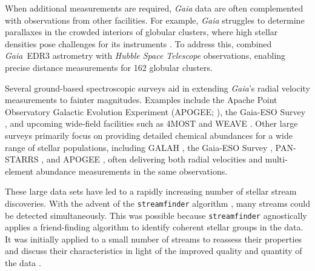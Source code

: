     When additional measurements are required, \emph{Gaia} data are often complemented with observations from other facilities.  For example, \emph{Gaia} struggles to determine parallaxes in the crowded interiors of globular clusters, where high stellar densities pose challenges for its instruments \citep{2017MNRAS.467..412P}. To address this, \citet{2021MNRAS.505.5957B} combined \emph{Gaia}~EDR3 astrometry with \emph{Hubble Space Telescope} observations, enabling precise distance measurements for 162 globular clusters.

    Several ground-based spectroscopic surveys aid in extending \emph{Gaia}'s radial velocity measurements to fainter magnitudes. Examples include the Apache Point Observatory Galactic Evolution Experiment (APOGEE; \citep{2017AJ....154...94M}), the Gaia-ESO Survey \citep{2023A&A...676A.129H}, and upcoming wide-field facilities such as 4MOST \citep{2019Msngr.175....3D} and WEAVE \citep{2014SPIE.9147E..0LD}.  Other large surveys primarily focus on providing detailed chemical abundances for a wide range of stellar populations, including GALAH \citep{2012ASPC..458..421Z}, the Gaia-ESO Survey \citep{2023A&A...676A.129H}, PAN-STARRS \citep{2016arXiv161205560C}, and APOGEE \citep{2017AJ....154...94M}, often delivering both radial velocities and multi-element abundance measurements in the same observations.

    These large data sets have led to a rapidly increasing number of stellar stream discoveries. With the advent of the \texttt{streamfinder} algorithm \citep{2018MNRAS.477.4063M,2018MNRAS.478.3862M}, many streams could be detected simultaneously. This was possible because \texttt{streamfinder} agnostically applies a friend-finding algorithm to identify coherent stellar groups in the data. It was initially applied to a small number of streams to reassess their properties and discuss their characteristics in light of the improved quality and quantity of the data \citep{2019NatAs...3..667I,2020ApJ...891..161I}.

